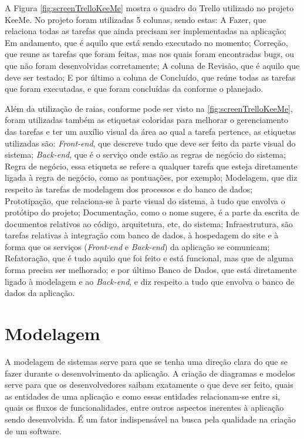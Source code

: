 A Figura \ref{fig:screenTrelloKeeMe} mostra o quadro do Trello utilizado no projeto KeeMe. No projeto foram utilizadas 5 colunas, sendo estas: A Fazer, que relaciona todas as tarefas que ainda precisam ser implementadas na aplicação; Em andamento, que é aquilo que está sendo executado no momento; Correção, que reune as tarefas que foram feitas, mas nos quais foram encontradas bugs, ou que não foram desenvolvidas corretamente; A coluna de Revisão, que é aquilo que deve ser testado; E por último a coluna de Concluído, que reúne todas as tarefas que foram executadas, e que foram concluídas da conforme o planejado.

Além da utilização de raias, conforme pode ser visto na \ref{fig:screenTrelloKeeMe}, foram utilizadas também as etiquetas coloridas para melhorar o gerenciamento das tarefas e ter um auxílio visual da área ao qual a tarefa pertence, as etiquetas utilizadas são: \textit{Front-end}, que descreve tudo que deve ser feito da parte visual do sistema; \textit{Back-end}, que é o serviço onde estão as regras de negócio do sistema; Regra de negócio, essa etiqueta se refere a qualquer tarefa que esteja diretamente ligada à regra de negócio, como as pontuações, por exemplo; Modelagem, que diz respeito às tarefas de modelagem dos processos e do banco de dados; Prototipação, que relaciona-se à parte visual do sistema, à tudo que envolva o protótipo do projeto; Documentação, como o nome sugere, é a parte da escrita de documentos relativos ao código, arquitetura, etc, do sistema; Infraestrutura, são tarefas relativas à integração com banco de dados, à hospedagem do site e à forma que os serviços (\textit{Front-end} e \textit{\textit{Back-end}}) da aplicação se comunicam; Refatoração, que é tudo aquilo que foi feito e está funcional, mas que de alguma forma precisa ser melhorado; e por último Banco de Dados, que está diretamente ligado à modelagem e ao \textit{Back-end}, e diz respeito a tudo que envolva o banco de dados da aplicação.

\section{Modelagem}
\label{sec:modelagem}

A modelagem de sistemas serve para que se tenha uma direção clara do que se fazer durante o desenvolvimento da aplicação. A criação de diagramas e modelos serve para que os desenvolvedores saibam exatamente o que deve ser feito, quais as entidades de uma aplicação e como essas entidades relacionam-se entre si, quais os fluxos de funcionalidades, entre outros aspectos inerentes à aplicação sendo desenvolvida. É um fator indispensável na busca pela qualidade na criação de um software.

